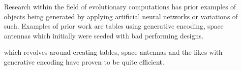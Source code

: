 Research within the field of evolutionary computations has prior examples of objects being generated
by applying artificial neural networks or variations of such.
Examples of prior work are tables using generative encoding, space antennas which initially were seeded with bad performing designs.

which revolves around creating tables, space antennas and the likes with generative encoding
have proven to be quite efficient.


